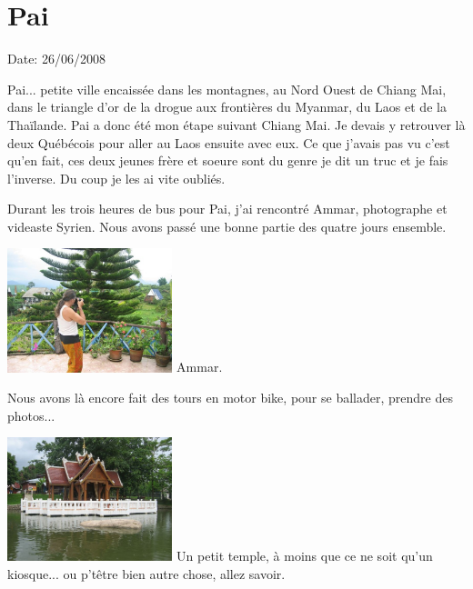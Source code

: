 \section{Pai}

Date: 26/06/2008

\begin{multicols}{2}

Pai... petite ville encaissée dans les montagnes, au Nord Ouest de Chiang Mai, dans le triangle d'or de la drogue aux frontières du Myanmar, du Laos et de la Thaïlande. Pai a donc été mon étape suivant Chiang Mai. Je devais y retrouver là deux Québécois pour aller au Laos ensuite avec eux. Ce que j'avais pas vu c'est qu'en fait, ces deux jeunes frère et soeure sont du genre je dit un truc et je fais l'inverse. Du coup je les ai vite oubliés.

Durant les trois heures de bus pour Pai, j'ai rencontré Ammar, photographe et videaste Syrien. Nous avons passé une bonne partie des quatre jours ensemble.

\hspace*{-0.65cm}
\includegraphics[width=4.8cm]{articles/Pai/1214286262syiV.jpg}
Ammar.

Nous avons là encore fait des tours en motor bike, pour se ballader, prendre des photos...


\hspace*{-0.65cm}
\includegraphics[width=4.8cm]{articles/Pai/1214286159uUtC.jpg}
Un petit temple, à moins que ce ne soit qu'un kiosque... ou p'têtre bien autre chose, allez savoir.


\end{multicols}
